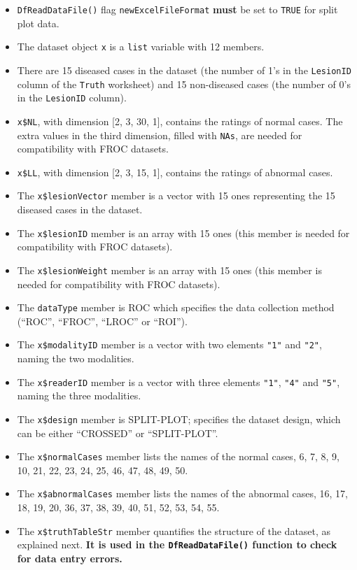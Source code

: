 \documentclass[
]{book}
\providecommand{\tightlist}{%
  \setlength{\itemsep}{0pt}\setlength{\parskip}{0pt}}
\begin{document}
\begin{itemize}
\tightlist
\item
  \texttt{DfReadDataFile()} flag \texttt{newExcelFileFormat} \textbf{must} be set to \texttt{TRUE} for split plot data.
\item
  The dataset object \texttt{x} is a \texttt{list} variable with 12 members.
\item
  There are 15 diseased cases in the dataset (the number of 1's in the \texttt{LesionID} column of the \texttt{Truth} worksheet) and 15 non-diseased cases (the number of 0's in the \texttt{LesionID} column).
\item
  \texttt{x\$NL}, with dimension {[}2, 3, 30, 1{]}, contains the ratings of normal cases. The extra values in the third dimension, filled with \texttt{NAs}, are needed for compatibility with FROC datasets.
\item
  \texttt{x\$LL}, with dimension {[}2, 3, 15, 1{]}, contains the ratings of abnormal cases.
\item
  The \texttt{x\$lesionVector} member is a vector with 15 ones representing the 15 diseased cases in the dataset.
\item
  The \texttt{x\$lesionID} member is an array with 15 ones (this member is needed for compatibility with FROC datasets).
\item
  The \texttt{x\$lesionWeight} member is an array with 15 ones (this member is needed for compatibility with FROC datasets).
\item
  The \texttt{dataType} member is ROC which specifies the data collection method (``ROC'', ``FROC'', ``LROC'' or ``ROI'').
\item
  The \texttt{x\$modalityID} member is a vector with two elements \texttt{"1"} and \texttt{"2"}, naming the two modalities.
\item
  The \texttt{x\$readerID} member is a vector with three elements \texttt{"1"}, \texttt{"4"} and \texttt{"5"}, naming the three modalities.
\item
  The \texttt{x\$design} member is SPLIT-PLOT; specifies the dataset design, which can be either ``CROSSED'' or ``SPLIT-PLOT''.
\item
  The \texttt{x\$normalCases} member lists the names of the normal cases, 6, 7, 8, 9, 10, 21, 22, 23, 24, 25, 46, 47, 48, 49, 50.
\item
  The \texttt{x\$abnormalCases} member lists the names of the abnormal cases, 16, 17, 18, 19, 20, 36, 37, 38, 39, 40, 51, 52, 53, 54, 55.
\item
  The \texttt{x\$truthTableStr} member quantifies the structure of the dataset, as explained next. \textbf{It is used in the \texttt{DfReadDataFile()} function to check for data entry errors.}
\end{itemize}
\end{document}
